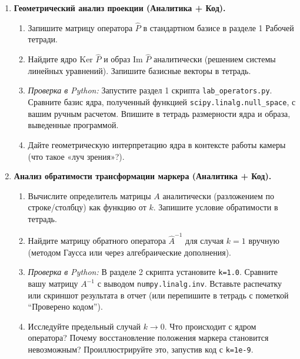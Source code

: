 \documentclass[a4paper,12pt]{article}
\begin{document}
\begin{enumerate}[label=\textbf{\arabic*.}, leftmargin=*]
    \item \textbf{Геометрический анализ проекции (Аналитика + Код).}
    \begin{enumerate}[label=\alph*), leftmargin=2em]
        \item Запишите матрицу оператора $\hat{P}$ в стандартном базисе в разделе 1 Рабочей тетради.
        \item Найдите ядро $\text{Ker }\hat{P}$ и образ $\text{Im }\hat{P}$ аналитически (решением системы линейных уравнений). Запишите базисные векторы в тетрадь.
        \item \textit{Проверка в Python:} Запустите раздел 1 скрипта \texttt{lab\_operators.py}. Сравните базис ядра, полученный функцией \texttt{scipy.linalg.null\_space}, с вашим ручным расчетом. Впишите в тетрадь размерности ядра и образа, выведенные программой.
        \item Дайте геометрическую интерпретацию ядра в контексте работы камеры (что такое «луч зрения»?).
    \end{enumerate}

    \item \textbf{Анализ обратимости трансформации маркера (Аналитика + Код).}
    \begin{enumerate}[label=\alph*), leftmargin=2em]
        \item Вычислите определитель матрицы $A$ аналитически (разложением по строке/столбцу) как функцию от $k$. Запишите условие обратимости в тетрадь.
        \item Найдите матрицу обратного оператора $\hat{A}^{-1}$ для случая $k=1$ вручную (методом Гаусса или через алгебраические дополнения).
        \item \textit{Проверка в Python:} В разделе 2 скрипта установите \texttt{k=1.0}. Сравните вашу матрицу $A^{-1}$ с выводом \texttt{numpy.linalg.inv}. Вставьте распечатку или скриншот результата в отчет (или перепишите в тетрадь с пометкой ``Проверено кодом'').
        \item Исследуйте предельный случай $k \to 0$. Что происходит с ядром оператора? Почему восстановление положения маркера становится невозможным? Проиллюстрируйте это, запустив код с \texttt{k=1e-9}.
    \end{enumerate}


\end{enumerate}
\end{document}
